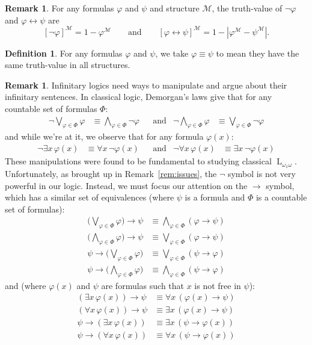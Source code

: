 \documentclass{amsart}
\theoremstyle{definition}
\newtheorem{remark}[theorem]{Remark}
\newtheorem{definition}[theorem]{Definition}
\numberwithin{equation}{theorem}
\renewcommand{\phi}{\varphi}
\newcommand{\narrow}[1]{\xrightarrow{#1}}
\renewcommand{\to}{\narrow{}}
\newcommand{\baselang}{\operatorname{L}}
\newcommand{\lang}{\baselang_{\omega_1\omega}}
\begin{document}
\begin{remark}
  For any formulas $\phi$ and $\psi$ and structure $\mathcal M$, the truth-value of $\neg\phi$ and $\phi\leftrightarrow\psi$ are
  \[
    [\neg\phi]^\mathcal M=1-\phi^\mathcal M\quad\quad\text{and}\quad\quad [\phi\leftrightarrow\psi]^\mathcal M=1-|\phi^\mathcal M-\psi^\mathcal M|.
  \]
\end{remark}
\begin{definition}
  For any formulas $\phi$ and $\psi$, we take $\phi\equiv\psi$ to mean they have the same truth-value in all structures.
\end{definition}
\begin{remark}
Infinitary logics need ways to manipulate and argue about their infinitary sentences.
  In classical logic, Demorgan's laws give that for any countable set of formulas $\Phi$:
  \begin{align*}
    \neg\bigvee_{\phi\in\Phi}\phi &\equiv \bigwedge_{\phi\in\Phi}\neg\phi&
    &\text{and}&
    \neg\bigwedge_{\phi\in\Phi}\phi &\equiv \bigvee_{\phi\in\Phi}\neg\phi
  \end{align*}
  and while we're at it, we observe that for any formula $\phi(x)$:
  \begin{align*}
    \neg\exists x\,\phi(x) &\equiv \forall x\,\neg\phi(x)&
    &\text{and}&
    \neg\forall x\,\phi(x) &\equiv \exists x\,\neg\phi(x)
  \end{align*}
  These manipulations were found to be fundamental to studying classical $\lang$.
  Unfortunately, as brought up in Remark~\ref{rem:issues}, the $\neg$ symbol is not very powerful in our logic.
  Instead, we must focus our attention on the $\to$ symbol, which has a similar set of equivalences (where $\psi$ is a formula and $\Phi$ is a countable set of formulas):
  \begin{align}\label{eqn:arrow-manip}
    \Big(\bigvee_{\phi\in\Phi}\phi\Big)\to\psi&\equiv \bigwedge_{\phi\in\Phi}(\phi\to\psi)\\
    \Big(\bigwedge_{\phi\in\Phi}\phi\Big)\to\psi&\equiv \bigvee_{\phi\in\Phi}(\phi\to\psi)\\
    \psi\to\Big(\bigvee_{\phi\in\Phi}\phi\Big)&\equiv \bigvee_{\phi\in\Phi}(\psi\to\phi)\\
    \psi\to\Big(\bigwedge_{\phi\in\Phi}\phi\Big)&\equiv \bigwedge_{\phi\in\Phi}(\psi\to\phi)
  \end{align}
  and (where $\phi(x)$ and $\psi$ are formulas such that $x$ is not free in $\psi$):
  \begin{align}
    (\exists x\,\phi(x))\to\psi &\equiv \forall x\,(\phi(x)\to\psi)\\
    (\forall x\,\phi(x))\to\psi &\equiv \exists x\,(\phi(x)\to\psi)\\
    \psi\to(\exists x\,\phi(x)) &\equiv \exists x\,(\psi\to\phi(x))\\
    \psi\to(\forall x\,\phi(x)) &\equiv \forall x\,(\psi\to\phi(x))\label{eqn:arrow-manip-end}
  \end{align}
\end{remark}
\end{document}
